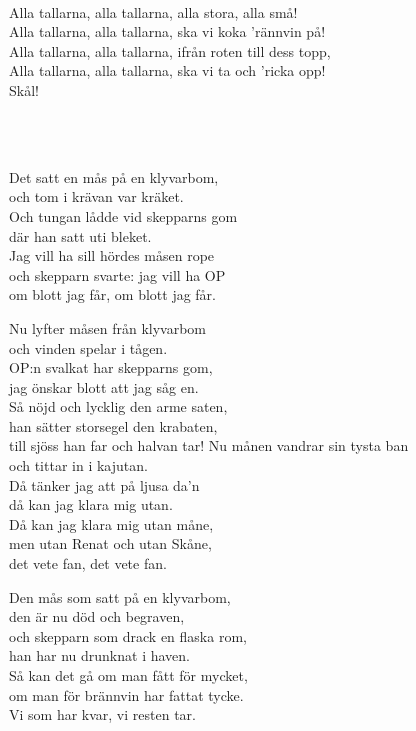 \newpage

 \\       
\author{Text: Lars T. Johansson och Ehrling Eliasson}

\songtext{}
Alla tallarna, alla tallarna, alla stora, alla små!\\
Alla tallarna, alla tallarna, ska vi koka 'rännvin på!\\
Alla tallarna, alla tallarna, ifrån roten till dess topp,\\
Alla tallarna, alla tallarna, ska vi ta och 'ricka opp!\\
Skål! 

 \\

 \\       

\songtext{}Det satt en mås på en klyvarbom,\\
och tom i krävan var kräket.\\
Och tungan lådde vid skepparns gom\\
där han satt uti bleket.\\
Jag vill ha sill hördes måsen rope\\
och skepparn svarte: jag vill ha OP\\
om blott jag får, om blott jag får.

Nu lyfter måsen från klyvarbom\\
och vinden spelar i tågen.\\
OP:n svalkat har skepparns gom,\\
jag önskar blott att jag såg en.\\
Så nöjd och lycklig den arme saten,\\
han sätter storsegel den krabaten,\\
till sjöss han far och halvan tar!
\newpage
Nu månen vandrar sin tysta ban\\
och tittar in i kajutan.\\
Då tänker jag att på ljusa da'n\\
då kan jag klara mig utan.\\
Då kan jag klara mig utan måne,\\
men utan Renat och utan Skåne,\\
det vete fan, det vete fan.

Den mås som satt på en klyvarbom,\\
den är nu död och begraven,\\
och skepparn som drack en flaska rom,\\
han har nu drunknat i haven.\\
Så kan det gå om man fått för mycket,\\
om man för brännvin har fattat tycke.\\
Vi som har kvar, vi resten tar. \\

